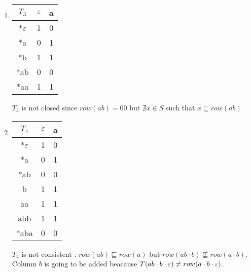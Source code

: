 \begin{enumerate}
  \item \begin{minipage}{0.3\textwidth}
          \begin{tabular}{c||c |c}
            $T_3$ & $\varepsilon$ & a \\
            \hline\hline
            *$\varepsilon$ & 1    & 0 \\
            *a    & 0    & 1 \\
            \hline\hline
            *b    & 1    & 1 \\
            *ab   & 0    & 0 \\
            *aa   & 1    & 1 \\
          \end{tabular}
        \end{minipage}\quad
        \begin{minipage}{0.6\textwidth}
          $T_3$ is not closed since $row(ab) = 00$ but $\nexists x \in S$ such that $x \sqsubseteq row(ab)$
        \end{minipage}

  \item \begin{minipage}{0.3\textwidth}
          \begin{tabular}{c||c |c}
            $T_4$ & $\varepsilon$ & a \\
            \hline\hline
            *$\varepsilon$ & 1    & 0 \\
            *a    & 0    & 1 \\
            *ab   & 0    & 0 \\
            \hline\hline
            b     & 1    & 1 \\
            aa    & 1    & 1 \\
            abb   & 1    & 1 \\
            *aba  & 0    & 0 \\
          \end{tabular}
        \end{minipage}\quad
        \begin{minipage}{0.6\textwidth}
          $T_4$ is not consistent : $row(ab) \sqsubseteq row(a)$ but $row(ab \cdot b) \not\sqsubseteq row(a \cdot b)$. Column $b$ is going to be added beacause $T(ab \cdot b \cdot \varepsilon) \neq row(a \cdot b \cdot \varepsilon)$.
        \end{minipage}


\end{enumerate}
